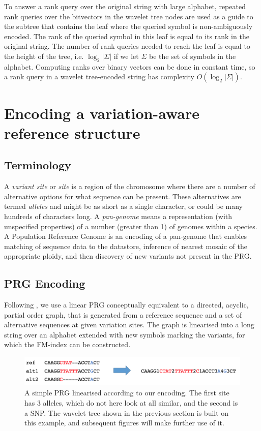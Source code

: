 \documentclass[runningheads,a4paper]{llncs}
\begin{document}
To answer a rank query over the original string with large alphabet, repeated rank queries over the bitvectors in the wavelet tree nodes are used as a guide to the  subtree that contains the leaf where the queried symbol is non-ambiguously encoded. The rank of the queried symbol in this leaf is equal to its rank in the original string. The number of rank queries needed to reach the leaf is equal to the height of the tree, i.e. $\log_{2} {|\Sigma|}$ if we let $\Sigma$ be the set of symbols in the alphabet. Computing ranks over binary vectors can be done in constant time, so a rank query in a wavelet tree-encoded string has complexity $O(\log_{2} {|\Sigma|})$. 

\section{Encoding a variation-aware reference structure}

\subsection{Terminology}
A \textit{variant site} or \textit{site} is a region of the chromosome where there are a number of alternative options for what sequence can be present.
These alternatives are termed \textit{alleles} and might be as short as a single character, or could be many hundreds of characters long. A  \textit{pan-genome} means a representation (with unspecified properties) of a number (greater than 1) of genomes within a species. A Population Reference Genome is an encoding of a pan-genome that enables matching of sequence data to the datastore, inference of nearest mosaic of the appropriate ploidy, and then discovery of new variants not present in the PRG.

\subsection{PRG Encoding}



Following \cite{dilthey}, we use a linear PRG conceptually equivalent to a directed, acyclic, partial order graph, that is generated from a reference sequence and a set of alternative sequences at given variation sites. The graph is linearised into a long string over an alphabet extended with new symbols marking the variants, for which the FM-index can be constructed. 


\begin{figure}
\centering
\includegraphics[height=1.5cm]{linPRG}
\caption{A simple PRG linearised according to our encoding. The first site has 3 alleles, which do not here look at all similar, and the second is a SNP. The wavelet tree shown in the previous section is built on this example, and subsequent figures will make further use of it.}
\label{lab}
\end{figure}
\end{document}
